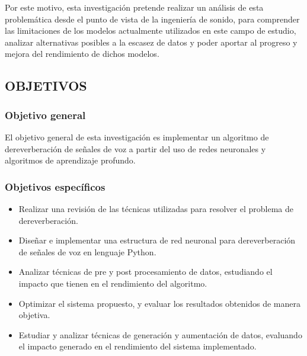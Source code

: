 Por este motivo, esta investigación pretende realizar un análisis de esta problemática desde el punto de vista de la ingeniería de sonido, para comprender las limitaciones de los modelos actualmente utilizados en este campo de estudio, analizar alternativas posibles a la escasez de datos y poder aportar al progreso y mejora del rendimiento de dichos modelos. 

\subsection[Objetivos]{OBJETIVOS}
\subsubsection{Objetivo general}

El objetivo general de esta investigación es implementar un algoritmo de dereverberación de señales de voz a partir del uso de redes neuronales y algoritmos de aprendizaje profundo. 

\subsubsection{Objetivos específicos}

\begin{itemize}
    \item Realizar una revisión de las técnicas utilizadas para resolver el problema de dereverberación.
    \item Diseñar e implementar una estructura de red neuronal para dereverberación de señales de voz en lenguaje Python.
    \item Analizar técnicas de pre y post procesamiento de datos, estudiando el impacto que tienen en el rendimiento del algoritmo.
    \item Optimizar el sistema propuesto, y evaluar los resultados obtenidos de manera objetiva.
    \item Estudiar y analizar técnicas de generación y aumentación de datos, evaluando el impacto generado en el rendimiento del sistema implementado. 
\end{itemize}

